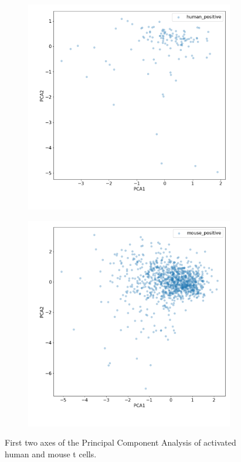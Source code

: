 \begin{figure}[h]
	\centering
	\begin{subfigure}{0.49\linewidth}
		\includegraphics[width=\textwidth]{fig/positive_control_human}
	\end{subfigure}
	\hfill
	\begin{subfigure}{0.49\linewidth}
		\includegraphics[width=\textwidth]{fig/positive_control_mouse}
	\end{subfigure}
	
	\caption{First two axes of the Principal Component Analysis of activated human and mouse t cells.}
	\label{fig:positive_control}
\end{figure}

